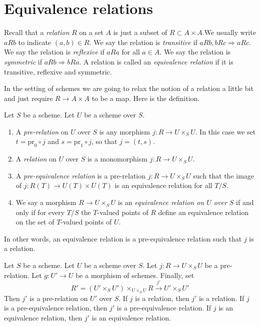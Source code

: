 \section{Equivalence relations}
\label{section-equivalence-relations}

\noindent
Recall that a {\it relation} $R$ on a set $A$ is just a subset
of $R \subset A \times A$.We usually write $a R b$ to indicate
$(a, b) \in R$. We say the relation is {\it transitive} if
$a R b, b R c \Rightarrow a R c$. We say the relation is
{\it reflexive} if $a R a$ for all $a \in A$. We say the relation is
{\it symmetric} if $a R b \Rightarrow b R a$.
A relation is called an {\it equivalence relation} if
it is transitive, reflexive and symmetric.

\medskip\noindent
In the setting of schemes we are going to relax the notion of a
relation a little bit and just require $R \to A \times A$ to
be a map. Here is the definition.

\begin{definition}
\label{definition-equivalence-relation}
Let $S$ be a scheme. Let $U$ be a scheme over $S$.
\begin{enumerate}
\item A {\it pre-relation} on $U$ over $S$ is any morphism
$j : R \to U \times_S U$. In this case we set
$t = \text{pr}_0 \circ j$ and $s = \text{pr}_1 \circ j$, so
that $j = (t, s)$.
\item A {\it relation} on $U$ over $S$ is a monomorphism
$j : R \to U \times_S U$.
\item A {\it pre-equivalence relation} is a pre-relation
$j : R \to U\times_SU$ such that the image of
$j : R(T) \to U(T) \times U(T)$ is an equivalence relation for
all $T/S$.
\item We say a morphism $R \to U \times_S U$ is
an {\it equivalence relation on $U$ over $S$}
if and only if for every $T/S$ the $T$-valued
points of $R$ define an equivalence relation
on the set of $T$-valued points of $U$.
\end{enumerate}
\end{definition}

\noindent
In other words, an equivalence relation is a pre-equivalence relation
such that $j$ is a relation.

\begin{lemma}
\label{lemma-restrict-relation}
Let $S$ be a scheme.
Let $U$ be a scheme over $S$.
Let $j : R \to U \times_S U$ be a pre-relation.
Let $g : U' \to U$ be a morphism of schemes.
Finally, set
$$
R' = (U' \times_S U')\times_{U \times_S U} R
\xrightarrow{j'}
U' \times_S U'
$$
Then $j'$ is a pre-relation on $U'$ over $S$.
If $j$ is a relation, then $j'$ is a relation.
If $j$ is a pre-equivalence relation, then $j'$ is a pre-equivalence relation.
If $j$ is an equivalence relation, then $j'$ is an equivalence relation.
\end{lemma}

